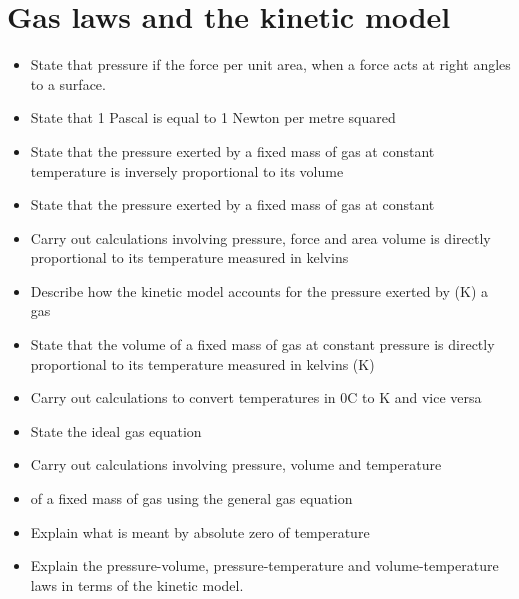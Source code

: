 \section{Gas laws and the kinetic model}
\begin{multicols}{2}
	\begin{itemize}
		\item State that pressure if the force per unit area, when a force acts at right
			angles to a surface.
		\item  State that 1 Pascal is equal to 1 Newton per metre squared
		\item  State that the pressure exerted by a fixed mass of gas at constant
			temperature is inversely proportional to its volume
		\item State that the pressure exerted by a fixed mass of gas at constant
		\item Carry out calculations involving pressure, force and area volume is
			directly proportional to its temperature measured in kelvins
		\item Describe how the kinetic model accounts for the pressure exerted by (K)
			a gas
		\item State that the volume of a fixed mass of gas at constant pressure is
			directly proportional to its temperature measured in kelvins (K)
		\item Carry out calculations to convert temperatures in 0C to K and vice versa
		\item State the ideal gas equation
		\item Carry out calculations involving pressure, volume and temperature
		\item of a fixed mass of gas using the general gas equation
		\item Explain what is meant by absolute zero of temperature
		\item Explain the pressure-volume, pressure-temperature and
			volume-temperature laws in terms of the kinetic model.
	\end{itemize}
\end{multicols}
